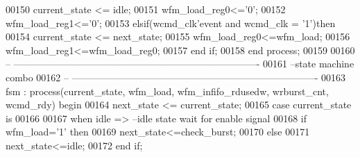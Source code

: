 \begin{DoxyCode}
00150         \textcolor{vhdlchar}{current_state} \textcolor{vhdlchar}{<=} \textcolor{vhdlchar}{idle};
00151         \textcolor{vhdlchar}{wfm_load_reg0}\textcolor{vhdlchar}{<=}\textcolor{vhdlchar}{'}\textcolor{vhdllogic}{}\textcolor{vhdllogic}{0}\textcolor{vhdlchar}{'};
00152         \textcolor{vhdlchar}{wfm_load_reg1}\textcolor{vhdlchar}{<=}\textcolor{vhdlchar}{'}\textcolor{vhdllogic}{}\textcolor{vhdllogic}{0}\textcolor{vhdlchar}{'};
00153     \textcolor{keywordflow}{elsif}\textcolor{vhdlchar}{(}\textcolor{vhdlchar}{wcmd_clk}\textcolor{vhdlchar}{'}\textcolor{vhdlkeyword}{event} \textcolor{keywordflow}{and} \textcolor{vhdlchar}{wcmd_clk} \textcolor{vhdlchar}{=} \textcolor{vhdlchar}{'}\textcolor{vhdllogic}{}\textcolor{vhdllogic}{1}\textcolor{vhdlchar}{'}\textcolor{vhdlchar}{)}\textcolor{keywordflow}{then} 
00154         \textcolor{vhdlchar}{current_state} \textcolor{vhdlchar}{<=} \textcolor{vhdlchar}{next_state};
00155         \textcolor{vhdlchar}{wfm_load_reg0}\textcolor{vhdlchar}{<=}\textcolor{vhdlchar}{wfm_load};
00156         \textcolor{vhdlchar}{wfm_load_reg1}\textcolor{vhdlchar}{<=}\textcolor{vhdlchar}{wfm_load_reg0};
00157     \textcolor{keywordflow}{end} \textcolor{keywordflow}{if}; 
00158 \textcolor{keywordflow}{end} \textcolor{keywordflow}{process};
00159 
00160 \textcolor{keyword}{-- ----------------------------------------------------------------------------}
00161 \textcolor{keyword}{--state machine combo}
00162 \textcolor{keyword}{-- ----------------------------------------------------------------------------}
00163 fsm : \textcolor{keywordflow}{process}(current_state, wfm_load, wfm_infifo_rdusedw, wrburst_cnt, wcmd_rdy) \textcolor{keywordflow}{begin}
00164     \textcolor{vhdlchar}{next_state} \textcolor{vhdlchar}{<=} \textcolor{vhdlchar}{current_state};
00165     \textcolor{keywordflow}{case} \textcolor{vhdlchar}{current_state} \textcolor{keywordflow}{is}
00166       
00167         \textcolor{keywordflow}{when} \textcolor{vhdlchar}{idle} \textcolor{vhdlchar}{=}\textcolor{vhdlchar}{>}\textcolor{keyword}{ --idle state wait for enable signal}
00168             \textcolor{keywordflow}{if} \textcolor{vhdlchar}{wfm_load}\textcolor{vhdlchar}{=}\textcolor{vhdlchar}{'}\textcolor{vhdllogic}{}\textcolor{vhdllogic}{1}\textcolor{vhdlchar}{'} \textcolor{keywordflow}{then}
00169                 \textcolor{vhdlchar}{next_state}\textcolor{vhdlchar}{<=}\textcolor{vhdlchar}{check\_burst};
00170             \textcolor{keywordflow}{else}    
00171                 \textcolor{vhdlchar}{next_state}\textcolor{vhdlchar}{<=}\textcolor{vhdlchar}{idle};
00172             \textcolor{keywordflow}{end} \textcolor{keywordflow}{if};

\end{DoxyCode}
